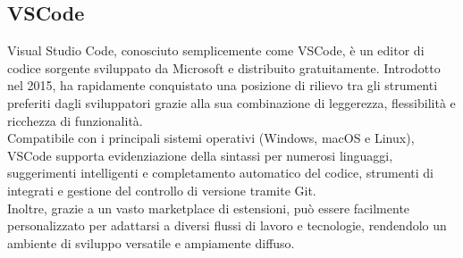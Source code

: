 \subsection{VSCode}
Visual Studio Code, conosciuto semplicemente come VSCode, è un editor di codice sorgente sviluppato da Microsoft e distribuito gratuitamente. Introdotto nel 2015, ha rapidamente conquistato una posizione di rilievo tra gli strumenti preferiti dagli sviluppatori grazie alla sua combinazione di leggerezza, flessibilità e ricchezza di funzionalità. \\Compatibile con i principali sistemi operativi (Windows, macOS e Linux), VSCode supporta evidenziazione della sintassi per numerosi linguaggi, suggerimenti intelligenti e completamento automatico del codice, strumenti di  integrati e gestione del controllo di versione tramite Git. \\Inoltre, grazie a un vasto marketplace di estensioni, può essere facilmente personalizzato per adattarsi a diversi flussi di lavoro e tecnologie, rendendolo un ambiente di sviluppo versatile e ampiamente diffuso.

\newpage